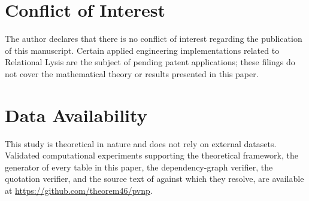 \documentclass[pdflatex,sn-mathphys-num]{sn-jnl}
\theoremstyle{thmstyleone}%
\theoremstyle{thmstyletwo}%
\theoremstyle{thmstylethree}%
\newcommand{\PA}{\cite{Swanagon2026PA}}
\begin{document}
\FloatBarrier
\clearpage
\section*{Conflict of Interest}
The author declares that there is no conflict of interest regarding the publication of this manuscript. Certain applied engineering implementations related to Relational Lysis are the subject of pending patent applications; these filings do not cover the mathematical theory or results presented in this paper.

\section*{Data Availability}
This study is theoretical in nature and does not rely on external datasets. Validated computational experiments supporting the theoretical framework, the generator of every table in this paper, the dependency-graph verifier, the quotation verifier, and the source text of \PA{} against which they resolve, are available at \url{https://github.com/theorem46/pvnp}.
\end{document}
